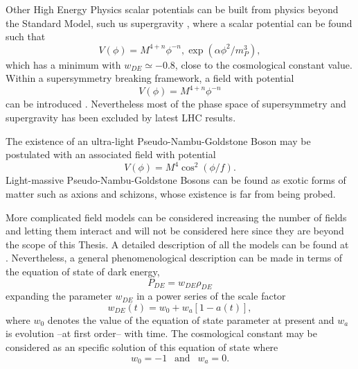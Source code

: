Other High Energy Physics scalar potentials can be built from physics beyond the Standard Model, such us supergravity \cite{1999PhLB..468...40B,1999astro.ph.12005B,2000PhRvD..61j3502B}, where a scalar potential can be found such that
\begin{equation}
V(\phi) = M^{4+n}\phi^{-n},\exp(\alpha\phi^2/m^3_P),
\end{equation}
which has a minimum with $w_{DE}\simeq -0.8$, close to the cosmological constant value. Within a supersymmetry breaking framework, a field with potential 
\begin{equation}
V(\phi) = M^{4+n}\phi^{-n}
\end{equation}
can be introduced \cite{1999PhRvD..60f3502B}. Nevertheless most of the phase space of supersymmetry and supergravity has been excluded by latest LHC results.
\newline

The existence of an ultra-light Pseudo-Nambu-Goldstone Boson may be postulated with an associated field with potential \cite{PhysRevLett.75.2077,1992PhRvD..45.2674F}
\begin{equation}
V(\phi) = M^4\cos^2(\phi/f).
\end{equation}
Light-massive Pseudo-Nambu-Goldstone Bosons can be found as exotic forms of matter such as axions and schizons, whose existence is far from being probed.
\newline

More complicated field models can be considered increasing the number of fields and letting them interact and will not be considered here since they are beyond the scope of this Thesis. A detailed description of all the models can be found at \cite{2010deto.book.....A}. Nevertheless, a general phenomenological description can be made in terms of the equation of state of dark energy,
\begin{equation}
P_{DE} = w_{DE}\rho_{DE}
\end{equation}
expanding the parameter $w_{DE}$ in a power series of the scale factor
\begin{equation}
w_{DE}(t) = w_0 +w_a[1-a(t)],
\end{equation}
where $w_0$ denotes the value of the equation of state parameter at present and $w_a$ is evolution --at first order-- with time. The cosmological constant may be considered as an specific solution of this equation of state where
\begin{equation}
w_0=-1\ \ \mbox{ and }\ \ w_a=0.
\end{equation}

